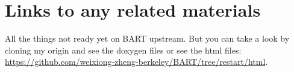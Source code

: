 \documentclass{article}
\begin{document}
\section{Links to any related materials}
All the things not ready yet on BART upstream. But you can take a look by cloning my origin and see the doxygen files or see the html files:  \url{https://github.com/weixiong-zheng-berkeley/BART/tree/restart/html}.



%
%
%

\end{document}

